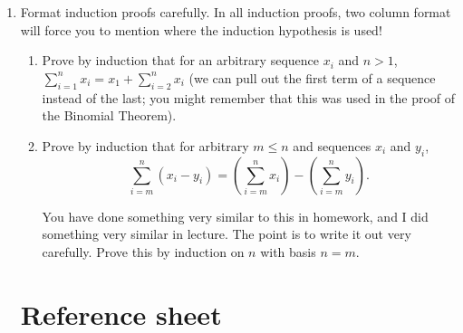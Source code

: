 \documentclass[12pt]{article}
\begin{document}
\begin{enumerate}
\begin{enumerate}

\end{enumerate}

\newpage

\item 

Format induction proofs carefully.  In all induction proofs, two column format will force you to mention where the induction hypothesis is used!

\begin{enumerate}
\item  Prove by induction that for an arbitrary sequence $x_i$ and $n>1$, $\sum_{i=1}^n x_i = x_1 + \sum_{i=2}^n x_i$ (we can pull out the first term of a sequence instead of the last;  you might remember that this was used in the proof of the Binomial Theorem).

\newpage

\item Prove by induction that for arbitrary $m \leq n$ and sequences $x_i$ and $y_i$, $$\sum_{i=m}^n (x_i-y_i) = (\sum_{i=m}^n x_i) - (\sum_{i=m}^n y_i).$$

You have done something very similar to this in homework, and I did something very similar in lecture.  The point is to write it out very carefully.    Prove
this by induction on $n$ with  basis $n=m$.
\end{enumerate}



\newpage

\section{Reference sheet}



\end{enumerate}
\end{document}
